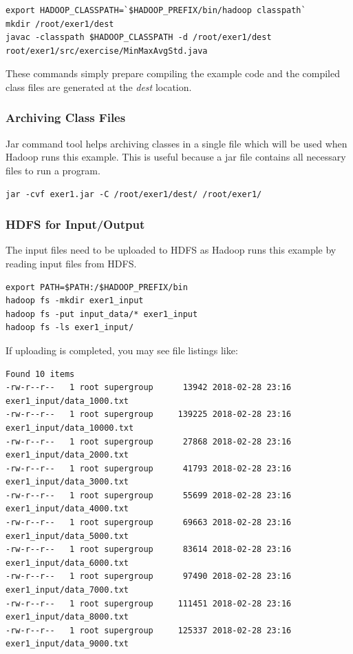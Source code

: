 \begin{lstlisting}
export HADOOP_CLASSPATH=`$HADOOP_PREFIX/bin/hadoop classpath`
mkdir /root/exer1/dest
javac -classpath $HADOOP_CLASSPATH -d /root/exer1/dest root/exer1/src/exercise/MinMaxAvgStd.java
\end{lstlisting}

These commands simply prepare compiling the example code and the
compiled class files are generated at the \textit{dest} location.

\subsubsection{Archiving Class Files}

Jar command tool helps archiving classes in a single file which will be used
when Hadoop runs this example. This is useful because a jar file contains all
necessary files to run a program.

\begin{lstlisting}
jar -cvf exer1.jar -C /root/exer1/dest/ /root/exer1/
\end{lstlisting}

\subsubsection{HDFS for Input/Output}

The input files need to be uploaded to HDFS as Hadoop runs this example by
reading input files from HDFS.

\begin{lstlisting}
export PATH=$PATH:/$HADOOP_PREFIX/bin
hadoop fs -mkdir exer1_input
hadoop fs -put input_data/* exer1_input
hadoop fs -ls exer1_input/
\end{lstlisting}

If uploading is completed, you may see file listings like:

\begin{lstlisting}
Found 10 items
-rw-r--r--   1 root supergroup      13942 2018-02-28 23:16 exer1_input/data_1000.txt
-rw-r--r--   1 root supergroup     139225 2018-02-28 23:16 exer1_input/data_10000.txt
-rw-r--r--   1 root supergroup      27868 2018-02-28 23:16 exer1_input/data_2000.txt
-rw-r--r--   1 root supergroup      41793 2018-02-28 23:16 exer1_input/data_3000.txt
-rw-r--r--   1 root supergroup      55699 2018-02-28 23:16 exer1_input/data_4000.txt
-rw-r--r--   1 root supergroup      69663 2018-02-28 23:16 exer1_input/data_5000.txt
-rw-r--r--   1 root supergroup      83614 2018-02-28 23:16 exer1_input/data_6000.txt
-rw-r--r--   1 root supergroup      97490 2018-02-28 23:16 exer1_input/data_7000.txt
-rw-r--r--   1 root supergroup     111451 2018-02-28 23:16 exer1_input/data_8000.txt
-rw-r--r--   1 root supergroup     125337 2018-02-28 23:16 exer1_input/data_9000.txt
\end{lstlisting}

